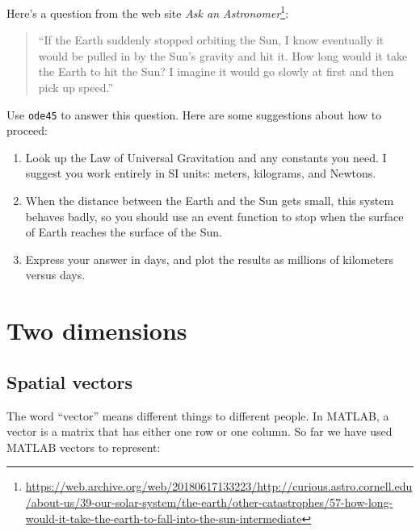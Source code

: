 \documentclass[
]{book}
\numberwithin{Answer}{chapter}
\numberwithin{Exercise}{chapter}
\begin{document}
\begin{ex}
Here's a question from the web site {\em Ask an Astronomer}\footnote{\url{https://web.archive.org/web/20180617133223/http://curious.astro.cornell.edu/about-us/39-our-solar-system/the-earth/other-catastrophes/57-how-long-would-it-take-the-earth-to-fall-into-the-sun-intermediate}}:

\begin{quote}
``If the Earth suddenly stopped orbiting the Sun, I know eventually it would be pulled in by the Sun's gravity and hit it. How long would it take the Earth to hit the Sun? I imagine it would go slowly at first and then pick up speed.''
\end{quote}

Use {\tt ode45} to answer this question.  Here are some suggestions about how to proceed:

\begin{enumerate}

\item Look up the Law of Universal Gravitation and any constants you need. I suggest you work entirely in SI units: meters, kilograms, and Newtons.

\item When the distance between the Earth and the Sun gets small, this system behaves badly, so you should use an event function to stop when the surface of Earth reaches the surface of the Sun.

\item Express your answer in days, and plot the results as millions of kilometers versus days.

\end{enumerate}

\end{ex}



\chapter{Two dimensions}

\section{Spatial vectors}
\label{sect:spacial}

The word ``vector'' means different
things to different people.  In MATLAB, a vector is a matrix that has
either one row or one column.  So far we have used MATLAB vectors to
represent:
\end{document}

